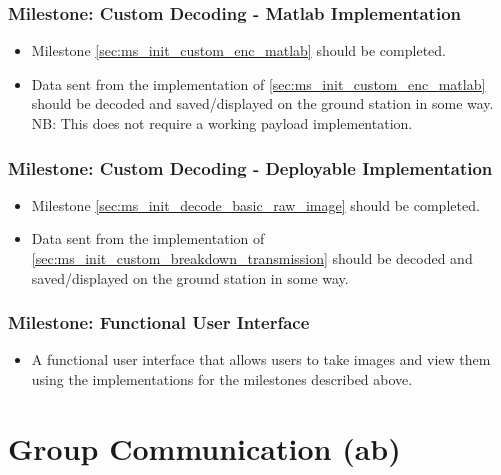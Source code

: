 	\subsubsection{Milestone: Custom Decoding - Matlab Implementation}
		\begin{itemize}
			\item 	Milestone \ref{sec:ms_init_custom_enc_matlab} should be completed.
			\item 	Data sent from the implementation of \ref{sec:ms_init_custom_enc_matlab} should be
				decoded and saved/displayed on the ground station in some way. NB: This does not require
				a working payload implementation.
		\end{itemize}

	\subsubsection{Milestone: Custom Decoding - Deployable Implementation}
		\begin{itemize}
			\item 	Milestone \ref{sec:ms_init_decode_basic_raw_image} should be completed.
			\item 	Data sent from the implementation of \ref{sec:ms_init_custom_breakdown_transmission} should be
				decoded and saved/displayed on the ground station in some way.
		\end{itemize}

	\subsubsection{Milestone: Functional User Interface}
		\begin{itemize}
			\item 	A functional user interface that allows users to take images and view them using the implementations
				for the milestones described above.
		\end{itemize}








\section{Group Communication (ab)}
\label{group_comms}
